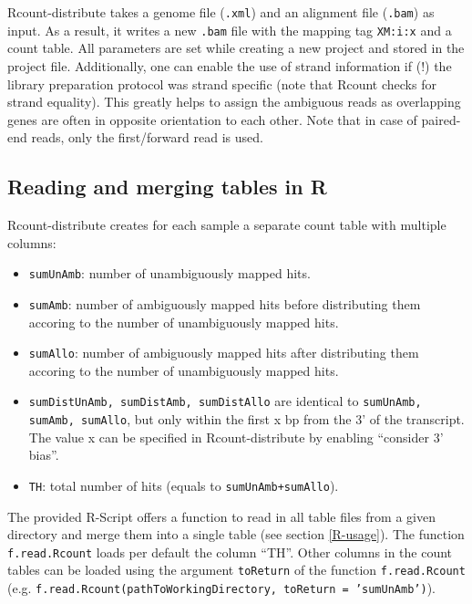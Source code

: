 \documentclass[a4paper,10pt]{article}
\begin{document}
\newline
\newline
Rcount-distribute takes a genome file (\texttt{.xml}) and an alignment file (\texttt{.bam}) as input. As a result, it writes a new \texttt{.bam} file with the mapping tag \texttt{XM:i:x} and a count table. All parameters are set while creating a new project and stored in the project file. Additionally, one can enable the use of strand information if (!) the library preparation protocol was strand specific (note that Rcount checks for strand equality). This greatly helps to assign the ambiguous reads as overlapping genes are often in opposite orientation to each other. Note that in case of paired-end reads, only the first/forward read is used.
\subsection{Reading and merging tables in R}
Rcount-distribute creates for each sample a separate count table with multiple columns:
\begin{itemize}
 \item \texttt{sumUnAmb}: number of unambiguously mapped hits.
 \item \texttt{sumAmb}: number of ambiguously mapped hits before distributing them accoring to the number of unambiguously mapped hits.
 \item \texttt{sumAllo}: number of ambiguously mapped hits after distributing them accoring to the number of unambiguously mapped hits.
 \item \texttt{sumDistUnAmb, sumDistAmb, sumDistAllo} are identical to \texttt{sumUnAmb, sumAmb, sumAllo}, but only within the first x bp from the 3' of the transcript. The value x can be specified in Rcount-distribute by enabling ``consider 3' bias''.
 \item \texttt{TH}: total number of hits (equals to \texttt{sumUnAmb+sumAllo}).
\end{itemize}
The provided R-Script offers a function to read in all table files from a given directory and merge them into a single table (see section \ref{R-usage}). The function \texttt{f.read.Rcount} loads per default the column ``TH''. Other columns in the count tables can be loaded using the argument \texttt{toReturn} of the function \texttt{f.read.Rcount} (e.g. \texttt{f.read.Rcount(pathToWorkingDirectory, toReturn = 'sumUnAmb')}). 
\clearpage
\end{document}
